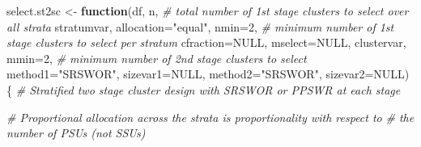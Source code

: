\documentclass[
]{book}
\newenvironment{Shaded}{\begin{snugshade}}{\end{snugshade}}
\newcommand{\AttributeTok}[1]{\textcolor[rgb]{0.13,0.29,0.53}{#1}}
\newcommand{\CommentTok}[1]{\textcolor[rgb]{0.56,0.35,0.01}{\textit{#1}}}
\newcommand{\ConstantTok}[1]{\textcolor[rgb]{0.56,0.35,0.01}{#1}}
\newcommand{\ControlFlowTok}[1]{\textcolor[rgb]{0.13,0.29,0.53}{\textbf{#1}}}
\newcommand{\DecValTok}[1]{\textcolor[rgb]{0.00,0.00,0.81}{#1}}
\newcommand{\NormalTok}[1]{#1}
\newcommand{\OtherTok}[1]{\textcolor[rgb]{0.56,0.35,0.01}{#1}}
\newcommand{\StringTok}[1]{\textcolor[rgb]{0.31,0.60,0.02}{#1}}
\begin{document}
\begin{Shaded}
\begin{Highlighting}[]
\NormalTok{select.st2sc }\OtherTok{\textless{}{-}} \ControlFlowTok{function}\NormalTok{(df,}
\NormalTok{                         n,      }\CommentTok{\# total number of 1st stage clusters to select over all strata}
\NormalTok{                         stratumvar, }\AttributeTok{allocation=}\StringTok{"equal"}\NormalTok{,}
                         \AttributeTok{nmin=}\DecValTok{2}\NormalTok{, }\CommentTok{\# minimum number of 1st stage clusters to select per stratum}
                         \AttributeTok{cfraction=}\ConstantTok{NULL}\NormalTok{, }\AttributeTok{mselect=}\ConstantTok{NULL}\NormalTok{, clustervar,}
                         \AttributeTok{mmin=}\DecValTok{2}\NormalTok{, }\CommentTok{\# minimum number of 2nd stage clusters to select}
                         \AttributeTok{method1=}\StringTok{"SRSWOR"}\NormalTok{, }\AttributeTok{sizevar1=}\ConstantTok{NULL}\NormalTok{,}
                         \AttributeTok{method2=}\StringTok{"SRSWOR"}\NormalTok{, }\AttributeTok{sizevar2=}\ConstantTok{NULL}\NormalTok{) \{}
  \CommentTok{\# Stratified two stage cluster design with SRSWOR or PPSWR at each stage}

  \CommentTok{\# Proportional allocation across the strata is proportionality with respect to }
  \CommentTok{\# the number of PSUs (not SSUs)}
  

\end{Highlighting}
\end{Shaded}
\end{document}
